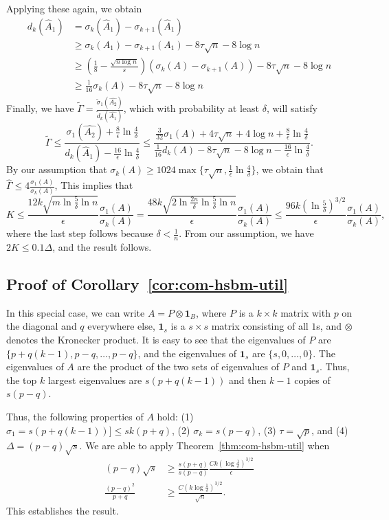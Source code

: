 Applying these again, we obtain
\begin{align*}
    d_k(\hat{A}_1) &= \sigma_{k}(\hat{A}_1) - \sigma_{k+1}(\hat{A}_1) \\
    &\geq \sigma_k(A_1) - \sigma_{k+1}(A_1) - 8\tau \sqrt{n} - 8\log n \\
    &\geq (\frac{1}{8}-\frac{\sqrt{n \log n}}{s})(\sigma_k(A) - \sigma_{k+1}(A)) - 8\tau \sqrt{n} - 8\log n \\
    &\geq \frac{1}{16}\sigma_k(A) - 8\tau \sqrt{n} - 8\log n
\end{align*}
Finally, we have $\tilde{\Gamma} = \frac{\tilde{\sigma}_1(\hat{A_2})}{\tilde{d}_k(\hat{A_1})}$, which with probability at least $\delta$, will satisfy
\[
\tilde{\Gamma} \leq \frac{\sigma_1(\hat{A_2}) + \frac{8}{\epsilon} \ln \frac{4}{\delta} }{d_k(\hat{A}_1) - \frac{16}{\epsilon} \ln \frac{4}{\delta}} \leq 
\frac{\frac{3}{32} \sigma_1(A) + 4\tau \sqrt{n} + 4 \log n + \frac{8}{\epsilon} \ln \frac{4}{\delta} }{\frac{1}{16}d_k(A) - 8\tau \sqrt{n} - 8\log n - \frac{16}{\epsilon} \ln \frac{4}{\delta}}.
\]
By our assumption that $\sigma_k(A) \geq 1024 \max \{\tau \sqrt{n}, \frac{1}{\epsilon} \ln \frac{4}{\delta} \}$, we obtain that $\hat{\Gamma} \leq 4 \frac{\sigma_1(A)}{\sigma_k(A)}$, 
This implies that 
\[
    K \leq \frac{12k \sqrt{m\ln \frac{5}{\delta} \ln n}}{\epsilon} \frac{\sigma_1(A)}{\sigma_k(A)} = \frac{48k \sqrt{2 \ln \frac{2n}{\delta} \ln \frac{5}{\delta} \ln n}}{\epsilon} \frac{\sigma_1(A)}{\sigma_k(A)}
    \leq \frac{96k (\ln \frac{5}{\delta})^{3/2}}{\epsilon} \frac{\sigma_1(A)}{\sigma_k(A)},
\]
where the last step follows because $\delta < \frac{1}{n}$. From our assumption, we have $2K \leq 0.1\Delta$, and the result follows.

\subsection{Proof of Corollary~\ref{cor:com-hsbm-util}}

In this special case, we can write $A = P \otimes \textbf{1}_B$, where $P$ is a $k \times k$ matrix with $p$ on the diagonal and $q$ everywhere else, $\textbf{1}_s$ is a $s \times s$ matrix consisting of all $1$s, and $\otimes$ denotes the Kronecker product. It is easy to see that the eigenvalues of $P$ are $\{p + q(k-1), p-q, \ldots, p-q\}$, and the eigenvalues of $\textbf{1}_s$ are $\{s, 0, \ldots, 0\}$. The eigenvalues of $A$ are the product of the two sets of eigenvalues of $P$ and $\textbf{1}_s$. Thus, the top $k$ largest eigenvalues are $s(p + q(k-1))$ and then $k-1$ copies of $s(p-q)$.

Thus, the following properties of $A$ hold: (1) $\sigma_1 = s(p + q(k-1)) ] \leq sk (p + q)$, (2) $\sigma_k = s(p-q)$, (3) $\tau = \sqrt{p}$, and (4) $\Delta = (p-q)\sqrt{s}$. We are able to apply Theorem~\ref{thm:com-hsbm-util} when 
\begin{align*}
    (p-q) \sqrt{s} &\geq \frac{s(p+q)}{s(p-q)} \frac{Ck(\log \frac{1}{\delta})^{3/2}}{\epsilon} \\
    \frac{(p-q)^2}{p+q} &\geq \frac{C(k\log \frac{1}{\delta})^{3/2}}{\sqrt{n}}.
\end{align*}
This establishes the result.